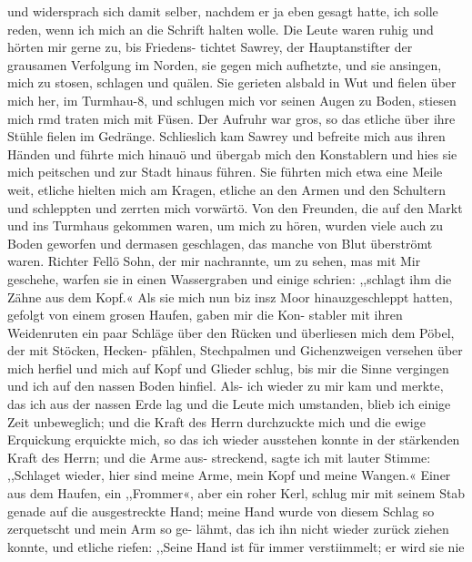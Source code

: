und widersprach sich damit selber, nachdem er ja eben gesagt
hatte, ich solle reden, wenn ich mich an die Schrift halten wolle.
Die Leute waren ruhig und hörten mir gerne zu, bis Friedens-
tichtet Sawrey, der Hauptanstifter der grausamen Verfolgung
im Norden, sie gegen mich aufhetzte, und sie ansingen, mich zu
stosen, schlagen und quälen. Sie gerieten alsbald in Wut und
fielen über mich her, im Turmhau-8, und schlugen mich vor seinen
Augen zu Boden, stiesen mich rmd traten mich mit Füsen. Der
Aufruhr war gros, so das etliche über ihre Stühle fielen im
Gedränge. Schlieslich kam Sawrey und befreite mich aus ihren
Händen und führte mich hinauö und übergab mich den Konstablern
und hies sie mich peitschen und zur Stadt hinaus führen. Sie
führten mich etwa eine Meile weit, etliche hielten mich am Kragen,
etliche an den Armen und den Schultern und schleppten und
zerrten mich vorwärtö. Von den Freunden, die auf den Markt
und ins Turmhaus gekommen waren, um mich zu hören, wurden
viele auch zu Boden geworfen und dermasen geschlagen, das
manche von Blut überströmt waren. Richter Fellö Sohn, der
mir nachrannte, um zu sehen, mas mit Mir geschehe, warfen sie
in einen Wassergraben und einige schrien: ,,schlagt ihm die Zähne
aus dem Kopf.« Als sie mich nun biz insz Moor hinauzgeschleppt
hatten, gefolgt von einem grosen Haufen, gaben mir die Kon-
stabler mit ihren Weidenruten ein paar Schläge über den
Rücken und überliesen mich dem Pöbel, der mit Stöcken, Hecken-
pfählen, Stechpalmen und Gichenzweigen versehen über mich
herfiel und mich auf Kopf und Glieder schlug, bis mir die
Sinne vergingen und ich auf den nassen Boden hinfiel. Als-
ich wieder zu mir kam und merkte, das ich aus der nassen
Erde lag und die Leute mich umstanden, blieb ich einige
Zeit unbeweglich; und die Kraft des Herrn durchzuckte mich und
die ewige Erquickung erquickte mich, so das ich wieder ausstehen
konnte in der stärkenden Kraft des Herrn; und die Arme aus-
streckend, sagte ich mit lauter Stimme: ,,Schlaget wieder, hier
sind meine Arme, mein Kopf und meine Wangen.« Einer aus
dem Haufen, ein ,,Frommer«, aber ein roher Kerl, schlug mir
mit seinem Stab genade auf die ausgestreckte Hand; meine Hand
wurde von diesem Schlag so zerquetscht und mein Arm so ge-
lähmt, das ich ihn nicht wieder zurück ziehen konnte, und etliche
riefen: ,,Seine Hand ist für immer verstiimmelt; er wird sie nie


